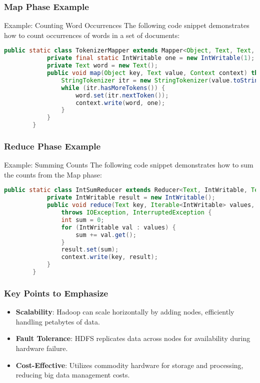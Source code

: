 \documentclass[aspectratio=169]{beamer}
\begin{document}
\begin{frame}[fragile]
    \frametitle{Map Phase Example}
    \begin{block}{Example: Counting Word Occurrences}
        The following code snippet demonstrates how to count occurrences of words in a set of documents:
        \begin{lstlisting}[language=Java]
        public static class TokenizerMapper extends Mapper<Object, Text, Text, IntWritable> {
            private final static IntWritable one = new IntWritable(1);
            private Text word = new Text();
            public void map(Object key, Text value, Context context) throws IOException, InterruptedException {
                StringTokenizer itr = new StringTokenizer(value.toString());
                while (itr.hasMoreTokens()) {
                    word.set(itr.nextToken());
                    context.write(word, one);
                }
            }
        }
        \end{lstlisting}
    \end{block}
\end{frame}

\begin{frame}[fragile]
    \frametitle{Reduce Phase Example}
    \begin{block}{Example: Summing Counts}
        The following code snippet demonstrates how to sum the counts from the Map phase:
        \begin{lstlisting}[language=Java]
        public static class IntSumReducer extends Reducer<Text, IntWritable, Text, IntWritable> {
            private IntWritable result = new IntWritable();
            public void reduce(Text key, Iterable<IntWritable> values, Context context) 
                throws IOException, InterruptedException {
                int sum = 0;
                for (IntWritable val : values) {
                    sum += val.get();
                }
                result.set(sum);
                context.write(key, result);
            }
        }
        \end{lstlisting}
    \end{block}
\end{frame}

\begin{frame}
    \frametitle{Key Points to Emphasize}
    \begin{itemize}
        \item \textbf{Scalability}: Hadoop can scale horizontally by adding nodes, efficiently handling petabytes of data.
        \item \textbf{Fault Tolerance}: HDFS replicates data across nodes for availability during hardware failure.
        \item \textbf{Cost-Effective}: Utilizes commodity hardware for storage and processing, reducing big data management costs.
    \end{itemize}
\end{frame}
\end{document}

